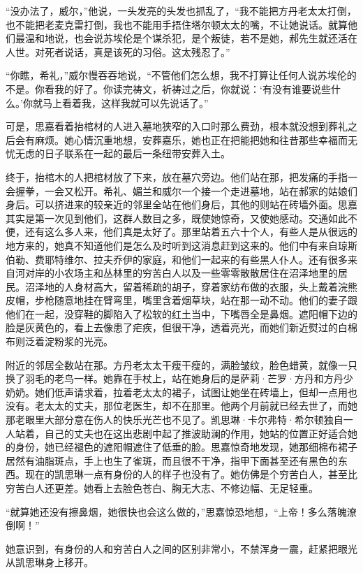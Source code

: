 \par “没办法了，威尔，”他说，一头发亮的头发也抓乱了，“我不能把方丹老太太打倒，也不能把老麦克雷打倒，我也不能用手捂住塔尔顿太太的嘴，不让她说话。就算他们最温和地说，也会说苏埃伦是个谋杀犯，是个叛徒，若不是她，郝先生就还活在人世。对死者说话，真是该死的习俗。这太残忍了。”
\par “你瞧，希礼，”威尔慢吞吞地说，“不管他们怎么想，我不打算让任何人说苏埃伦的不是。你看我的好了。你读完祷文，祈祷过之后，你就说：‘有没有谁要说些什么。’你就马上看着我，这样我就可以先说话了。”
\par 可是，思嘉看着抬棺材的人进入墓地狭窄的入口时那么费劲，根本就没想到葬礼之后会有麻烦。她心情沉重地想，安葬嘉乐，她也正在把能把她和往昔那些幸福而无忧无虑的日子联系在一起的最后一条纽带安葬入土。
\par 终于，抬棺木的人把棺材放了下来，放在墓穴旁边。他们站在那，把发痛的手指一会握拳，一会又松开。希礼、媚兰和威尔一个接一个走进墓地，站在郝家的姑娘们身后。可以挤进来的较亲近的邻里全站在他们身后，其他的则站在砖墙外面。思嘉其实是第一次见到他们，这群人数目之多，既使她惊奇，又使她感动。交通如此不便，还有这么多人来，他们真是太好了。那里站着五六十个人，有些人是从很远的地方来的，她真不知道他们是怎么及时听到这消息赶到这来的。他们中有来自琼斯伯勒、费耶特维尔、拉夫乔伊的家庭，和他们一起来的有些黑人仆人。还有很多来自河对岸的小农场主和丛林里的穷苦白人以及一些零零散散居住在沼泽地里的居民。沼泽地的人身材高大，留着稀疏的胡子，穿着家纺布做的衣服，头上戴着浣熊皮帽，步枪随意地挂在臂弯里，嘴里含着烟草块，站在那一动不动。他们的妻子跟他们在一起，没穿鞋的脚陷入了松软的红土当中，下嘴唇全是鼻烟。遮阳帽下边的脸是灰黄色的，看上去像患了疟疾，但很干净，透着亮光，而她们新近熨过的白棉布则泛着淀粉浆的光亮。
\par 附近的邻居全数站在那。方丹老太太干瘦干瘦的，满脸皱纹，脸色蜡黄，就像一只换了羽毛的老鸟一样。她靠在手杖上，站在她身后的是萨莉·芒罗·方丹和方丹少奶奶。她们低声请求着，拉着老太太的裙子，试图让她坐在砖墙上，但却一点用也没有。老太太的丈夫，那位老医生，却不在那里。他两个月前就已经去世了，而她那老眼里大部分意在伤人的快乐光芒也不见了。凯思琳·卡尔弗特·希尔顿独自一人站着，自己的丈夫也在这出悲剧中起了推波助澜的作用，她站的位置正好适合她的身份，她已经褪色的遮阳帽遮住了低垂的脸。思嘉惊奇地发现，她那细棉布裙子居然有油脂斑点，手上也生了雀斑，而且很不干净，指甲下面甚至还有黑色的东西。现在的凯思琳一点有身份的人的样子也没有了。她仿佛是个穷苦白人，甚至比穷苦白人还更差。她看上去脸色苍白、胸无大志、不修边幅、无足轻重。
\par “就算她还没有擦鼻烟，她很快也会这么做的，”思嘉惊恐地想，“上帝！多么落魄潦倒啊！”
\par 她意识到，有身份的人和穷苦白人之间的区别非常小，不禁浑身一震，赶紧把眼光从凯思琳身上移开。
